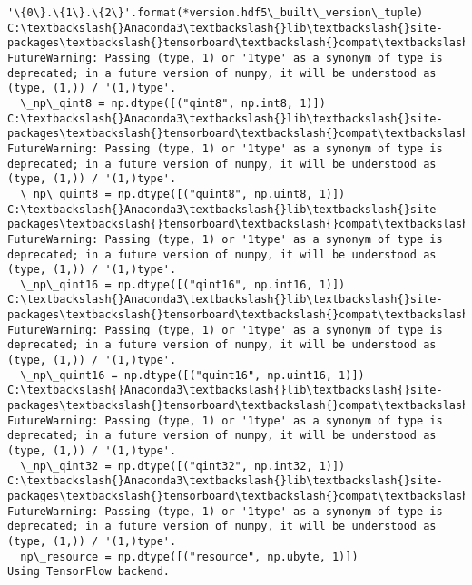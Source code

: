 \documentclass[11pt]{article}
\begin{document}
\begin{Verbatim}[commandchars=\\\{\}]
  '\{0\}.\{1\}.\{2\}'.format(*version.hdf5\_built\_version\_tuple)
C:\textbackslash{}Anaconda3\textbackslash{}lib\textbackslash{}site-packages\textbackslash{}tensorboard\textbackslash{}compat\textbackslash{}tensorflow\_stub\textbackslash{}dtypes.py:541: FutureWarning: Passing (type, 1) or '1type' as a synonym of type is deprecated; in a future version of numpy, it will be understood as (type, (1,)) / '(1,)type'.
  \_np\_qint8 = np.dtype([("qint8", np.int8, 1)])
C:\textbackslash{}Anaconda3\textbackslash{}lib\textbackslash{}site-packages\textbackslash{}tensorboard\textbackslash{}compat\textbackslash{}tensorflow\_stub\textbackslash{}dtypes.py:542: FutureWarning: Passing (type, 1) or '1type' as a synonym of type is deprecated; in a future version of numpy, it will be understood as (type, (1,)) / '(1,)type'.
  \_np\_quint8 = np.dtype([("quint8", np.uint8, 1)])
C:\textbackslash{}Anaconda3\textbackslash{}lib\textbackslash{}site-packages\textbackslash{}tensorboard\textbackslash{}compat\textbackslash{}tensorflow\_stub\textbackslash{}dtypes.py:543: FutureWarning: Passing (type, 1) or '1type' as a synonym of type is deprecated; in a future version of numpy, it will be understood as (type, (1,)) / '(1,)type'.
  \_np\_qint16 = np.dtype([("qint16", np.int16, 1)])
C:\textbackslash{}Anaconda3\textbackslash{}lib\textbackslash{}site-packages\textbackslash{}tensorboard\textbackslash{}compat\textbackslash{}tensorflow\_stub\textbackslash{}dtypes.py:544: FutureWarning: Passing (type, 1) or '1type' as a synonym of type is deprecated; in a future version of numpy, it will be understood as (type, (1,)) / '(1,)type'.
  \_np\_quint16 = np.dtype([("quint16", np.uint16, 1)])
C:\textbackslash{}Anaconda3\textbackslash{}lib\textbackslash{}site-packages\textbackslash{}tensorboard\textbackslash{}compat\textbackslash{}tensorflow\_stub\textbackslash{}dtypes.py:545: FutureWarning: Passing (type, 1) or '1type' as a synonym of type is deprecated; in a future version of numpy, it will be understood as (type, (1,)) / '(1,)type'.
  \_np\_qint32 = np.dtype([("qint32", np.int32, 1)])
C:\textbackslash{}Anaconda3\textbackslash{}lib\textbackslash{}site-packages\textbackslash{}tensorboard\textbackslash{}compat\textbackslash{}tensorflow\_stub\textbackslash{}dtypes.py:550: FutureWarning: Passing (type, 1) or '1type' as a synonym of type is deprecated; in a future version of numpy, it will be understood as (type, (1,)) / '(1,)type'.
  np\_resource = np.dtype([("resource", np.ubyte, 1)])
Using TensorFlow backend.

    \end{Verbatim}
\end{document}

